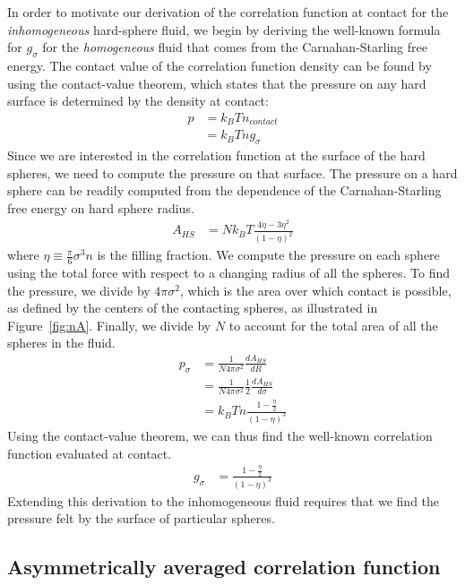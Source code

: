 \documentclass[letterpaper,amsmath,amssymb,10pt,pre]{revtex4-1}
\begin{document}
In order to motivate our derivation of the correlation function at
contact for the \emph{inhomogeneous} hard-sphere fluid, we begin by
deriving the well-known formula for $g_\sigma$ for the
\emph{homogeneous} fluid that comes from the Carnahan-Starling free
energy.  The contact value of the correlation function density can be
found by using the contact-value theorem, which states that the
pressure on any hard surface is determined by the density at contact:
\begin{align}
  p &= k_BT n_\textit{contact} \\
  &= k_BT n g_\sigma
\end{align}
Since we are interested in the correlation function at the surface of
the hard spheres, we need to compute the pressure on that surface.  The pressure on a hard sphere can be
readily computed from the dependence of the Carnahan-Starling free
energy on hard sphere radius.
\begin{align}
  A_{HS} &= Nk_BT \frac{4\eta - 3\eta^2}{(1-\eta)^2}
\end{align}
where $\eta \equiv \frac{\pi}{6} \sigma^3 n$ is the filling fraction.
We compute the pressure on each sphere using the total force with
respect to a changing radius of all the spheres.
To find the pressure, we divide by $4\pi \sigma^2$, which is the area
over which contact is possible, as defined by the centers of the
contacting spheres, as illustrated in Figure~\ref{fig:nA}.
Finally, we divide by $N$ to account for the total area of all the
spheres in the fluid.
\begin{align}
  p_\sigma &= \frac{1}{N 4\pi \sigma^2} \frac{dA_{HS}}{dR} \\
  &= \frac{1}{N 4\pi \sigma^2} \frac12 \frac{dA_{HS}}{d\sigma} \\
  &= k_BT n \frac{1 - \frac{\eta}2}{(1-\eta)^3}
\end{align}
Using the contact-value theorem, we can thus find the well-known
correlation function evaluated at contact.
\begin{align}
  g_\sigma &= \frac{1 - \frac{\eta}2}{(1-\eta)^3} \label{eq:cs-g}
\end{align}
Extending this derivation to the inhomogeneous fluid requires that we
find the pressure felt by the surface of particular spheres.


\subsection{Asymmetrically averaged correlation function}\label{sec:g-A}
\end{document}
